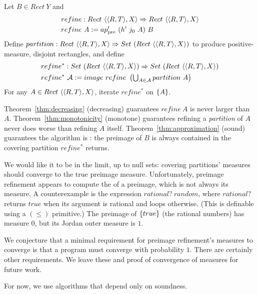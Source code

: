 \begin{definition}
\label{def:preimage-refinement}
Let $B \in Rect~Y$ and
\begin{equation}
\begin{aligned}
	&refine : Rect~\langle{\langle{R,T}\rangle,X}\rangle \Rightarrow Rect~\langle{\langle{R,T}\rangle,X}\rangle \\
	&refine~A := ap_\mathrm{pre}'~(h'~j_0~A)~B
\end{aligned}
\end{equation}
Define $partition : Rect~\langle{\langle{R,T}\rangle,X}\rangle \Rightarrow Set~(Rect~\langle{\langle{R,T}\rangle,X}\rangle)$ to produce positive-measure, disjoint rectangles, and define
\begin{equation}
\begin{aligned}
	&refine^* : Set~(Rect~\langle{\langle{R,T}\rangle,X}\rangle) \Rightarrow Set~(Rect~\langle{\langle{R,T}\rangle,X}\rangle) \\
	&refine^*~\mathcal{A} := image~refine~\left(\textstyle\bigcup_{A \in \mathcal{A}} partition~A \right)
\end{aligned}
\end{equation}
For any $A \in Rect~\langle{\langle{R,T}\rangle,X}\rangle$, iterate $refine^*$ on $\{{A}\}$.
\end{definition}

Theorem~\ref{thm:decreasing} (decreasing) guarantees $refine~A$ is never larger than $A$.
Theorem~\ref{thm:monotonicity} (monotone) guarantees refining a \emph{partition} of $A$ never does worse than refining $A$ itself.
Theorem~\ref{thm:approximation} (sound) guarantees the algorithm is : the preimage of $B$ is always contained in the covering partition $refine^*$ returns.

We would like it to be  in the limit, up to null sets: covering partitions' measures should converge to the true preimage measure.
Unfortunately, preimage refinement appears to compute the  of a preimage, which is not always its measure.
A counterexample is the expression $rational?~random$, where $rational?$ returns $true$ when its argument is rational and loops otherwise.
(This is definable using a $(\leq)$ primitive.)
The preimage of $\{{true}\}$ (the rational numbers) has measure $0$, but its Jordan outer measure is $1$.

We conjecture that a minimal requirement for preimage refinement's measures to converge is that a program must converge with probability $1$.
There are certainly other requirements.
We leave these and proof of convergence of measures for future work.

For now, we use algorithms that depend only on soundness.

